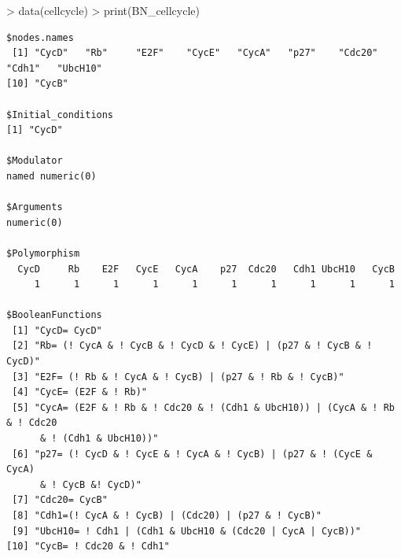 \documentclass[a4paper]{article}
\begin{document}
\begin{Schunk}
\begin{Sinput}
> data(cellcycle)
> print(BN_cellcycle)
\end{Sinput}
\end{Schunk}
\begin{verbatim}
$nodes.names
 [1] "CycD"   "Rb"     "E2F"    "CycE"   "CycA"   "p27"    "Cdc20"  "Cdh1"   "UbcH10"
[10] "CycB"  

$Initial_conditions
[1] "CycD"

$Modulator
named numeric(0)

$Arguments
numeric(0)

$Polymorphism
  CycD     Rb    E2F   CycE   CycA    p27  Cdc20   Cdh1 UbcH10   CycB 
     1      1      1      1      1      1      1      1      1      1 

$BooleanFunctions
 [1] "CycD= CycD"                                                                                    
 [2] "Rb= (! CycA & ! CycB & ! CycD & ! CycE) | (p27 & ! CycB & ! CycD)"                             
 [3] "E2F= (! Rb & ! CycA & ! CycB) | (p27 & ! Rb & ! CycB)"                                         
 [4] "CycE= (E2F & ! Rb)"                                                                            
 [5] "CycA= (E2F & ! Rb & ! Cdc20 & ! (Cdh1 & UbcH10)) | (CycA & ! Rb & ! Cdc20 
      & ! (Cdh1 & UbcH10))"
 [6] "p27= (! CycD & ! CycE & ! CycA & ! CycB) | (p27 & ! (CycE & CycA) 
      & ! CycB &! CycD)"           
 [7] "Cdc20= CycB"                                                                                   
 [8] "Cdh1=(! CycA & ! CycB) | (Cdc20) | (p27 & ! CycB)"                                             
 [9] "UbcH10= ! Cdh1 | (Cdh1 & UbcH10 & (Cdc20 | CycA | CycB))"                                      
[10] "CycB= ! Cdc20 & ! Cdh1"
\end{verbatim}
\end{document}
